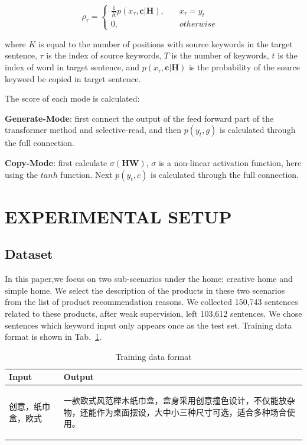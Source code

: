 \documentclass[sigconf]{acmart}
\begin{document}
\begin{equation}\label{equ:rho}
    \rho_\tau = \left\{
        \begin{aligned}
        \frac{1}{K} p(x_\tau,\textbf{c}|\textbf{H}), \quad & x_\tau = y_t & \\
        0, \quad & otherwise &
        \end{aligned} 
        \right.
\end{equation}

where $K$ is equal to the number of positions with source keywords in the target sentence, $\tau$ is the index of source keywords, $T$ is the number of keywords, $t$ is the index of word in target sentence, and $p(x_\tau,\textbf{c}|\textbf{H})$ is the probability of the source keyword be copied in target sentence. 

The score of each mode is calculated:

\textbf{Generate-Mode}: first connect the output of the feed forward part of the transformer method and selective-read, and then $p(y_t,g)$ is calculated through the full connection. 

\textbf{Copy-Mode}: first calculate $\sigma(\textbf{H}\textbf{W})$, $\sigma$ is a non-linear activation function, here using the $tanh$ function. Next $p(y_t,c)$ is calculated through the full connection. 

\section{EXPERIMENTAL SETUP}\label{sec:experiment}
\subsection{Dataset}
In this paper,we focus on two sub-scenarios under the home: creative home and simple home. We select the description of the products in these two scenarios from the list of product recommendation reasons. We collected 150,743 sentences related to these products, after weak supervision, left 103,612 sentences. We chose sentences which keyword input only appears once as the test set. Training data format is shown in Tab.~\ref{table:format}. 

\begin{table}
\caption{Training data format }\label{table:format}
\begin{center}
\begin{tabular}{p{2.5cm}p{5cm}}
    \toprule
    Input & Output \\
    \midrule
    \begin{CJK*}{UTF8}{gbsn}
        创意，纸巾盒，欧式
    \end{CJK*} &
    \begin{CJK*}{UTF8}{gbsn}
        一款欧式风范榉木纸巾盒，盒身采用创意撞色设计，不仅能放杂物，还能作为桌面摆设，大中小三种尺寸可选，适合多种场合使用。
    \end{CJK*} \\
    \bottomrule
\end{tabular}
\end{center}
\end{table}
\end{document}
